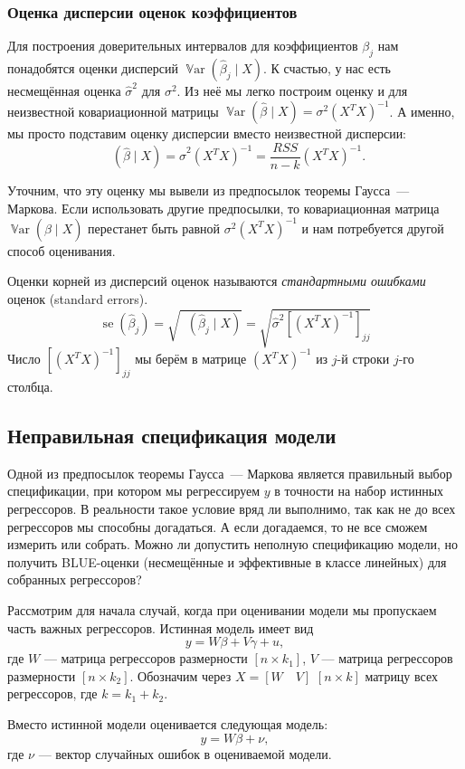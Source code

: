 \documentclass[12pt]{article}
\DeclareMathOperator{\Var}{\mathbb{V}ar}
\DeclareMathOperator{\hVar}{\widehat{\Var}}
\DeclareMathOperator{\se}{se}
\newcommand{\hb}{\hat{\beta}}
\newcommand{\hs}{\hat{\sigma}}
\newcommand{\RSS}{RSS}
\begin{document}
\subsubsection*{Оценка дисперсии оценок коэффициентов}

Для построения доверительных интервалов для коэффициентов $\beta_j$ нам понадобятся оценки дисперсий $\Var(\hb_j \mid X)$.
К счастью, у нас есть несмещённая оценка $\hs^2$ для $\sigma^2$.
Из неё мы легко построим оценку и для неизвестной ковариационной матрицы $\Var(\hb \mid X) = \sigma^2 (X^T X)^{-1}$.
А именно, мы просто подставим оценку дисперсии вместо неизвестной дисперсии:
\[
\hVar(\hb \mid X) = \hs^2 (X^T X)^{-1} = \frac{\RSS}{n - k} (X^TX)^{-1}.
\]

Уточним, что эту оценку мы вывели из предпосылок теоремы Гаусса~— Маркова. 
Если использовать другие предпосылки, то ковариационная матрица $\Var(\hb \mid X)$ перестанет быть равной $\sigma^2 (X^TX)^{-1}$ и нам потребуется другой способ оценивания. 


Оценки корней из дисперсий оценок называются \emph{стандартными ошибками} оценок (standard errors).
\[
\se(\hb_j) = \sqrt{\hVar(\hb_j \mid X)} = \sqrt{\hat\sigma^2 [(X^TX)^{-1}]_{jj}} 
\]
Число $[(X^TX)^{-1}]_{jj}$ мы берём в матрице $(X^TX)^{-1}$ из $j$-й строки $j$-го столбца.


\subsection{Неправильная спецификация модели}

Одной из предпосылок теоремы Гаусса~— Маркова является правильный выбор спецификации, при котором мы регрессируем $y$ в точности на набор истинных регрессоров. В реальности такое условие вряд ли выполнимо, так как не до всех регрессоров мы способны догадаться. А если догадаемся, то не все сможем измерить или собрать. Можно ли допустить неполную спецификацию модели, но получить BLUE-оценки (несмещённые и эффективные в классе линейных) для собранных регрессоров?

Рассмотрим для начала случай, когда при оценивании модели мы пропускаем часть важных регрессоров. Истинная модель имеет вид
\[
y = W\beta + V\gamma + u,
\]
где $W$ — матрица регрессоров размерности $[n \times k_1]$, $V$ — матрица регрессоров размерности $[n \times k_2]$. Обозначим через $X = [W \quad V]$ $[n \times k]$ матрицу всех регрессоров, где $k = k_1 + k_2$.

Вместо истинной модели оценивается следующая модель:
\[
y = W\beta + \nu,
\]
где $\nu$ — вектор случайных ошибок в оцениваемой модели.
\end{document}
